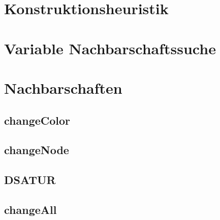 \section{Konstruktionsheuristik}

\section{Variable Nachbarschaftssuche}

\section{Nachbarschaften}

\subsection{changeColor}
\subsection{changeNode}
\subsection{DSATUR}
\subsection{changeAll}


 

